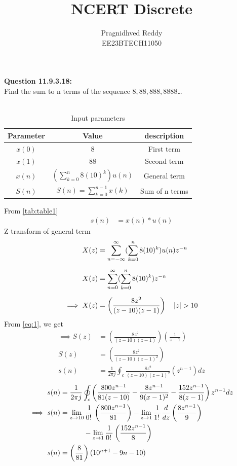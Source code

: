 \documentclass[journal,12pt,twocolumn]{IEEEtran}
\title{NCERT Discrete}
\author{Pragnidhved Reddy\\EE23BTECH11050}
\date{}
\begin{document}
\maketitle
\newpage
\bigskip
\textbf{Question 11.9.3.18:}\\
 Find the sum to n terms of the sequence $8,88,888,8888$\ldots\\
 \solution \\
 \begin{table}[H]
\centering
\setlength{\extrarowheight}{8pt}
\begin{tabular}{|c|c|c|}\hline
\textbf{Parameter} & \textbf{Value} & \textbf{description}\\ \hline
$x(0)$ & 8 & First term \\ \hline
$x(1)$ & 88 & Second term \\ \hline 
$x(n)$ & $(\sum^{n}_{k=0}8(10)^k)u(n)$ & General term \\ \hline
$S(n)$ & $S(n)=\sum^{n-1}_{k=0}x(k)$ & Sum of n terms \\ \hline
\end{tabular}
\caption{Input parameters}
\label{tab:table1}
\end{table}
 From \eqref{tab:table1}
\begin{align}
\label{eq:1}
 s(n)&=x(n)* u(n)
 \end{align}
 Z transform of general term
 \begin{align}
 X(z)&=\sum_{n=-\infty}^{\infty}(\sum_{k=0}^{n}8(10)^k)u(n)z^{-n}\\[6pt]
 X(z)&=\sum_{n=0}^{\infty}(\sum_{k=0}^{n}8(10)^k)z^{-n}\\[6pt]
 \implies X(z)&=\left(\frac{8z^2}{(z-10)(z-1)}\right) \quad \left\vert z\right\vert>10
\end{align}
From \eqref{eq:1}, we get
 \begin{align}
 \label{eq:6}
 \implies S(z)&=\left(\frac{8z^2}{(z-10)(z-1)}\right)\left(\frac{1}{z-1}\right)\\[6pt]
 S(z)&=\left(\frac{8z^2}{(z-10)(z-1)^2}\right)\\[6pt]
 s(n)&=\frac{1}{2\pi j}\oint_{c}\frac{8z^2}{(z-10)(z-1)^2}(z^{n-1})dz
 \end{align}
\begin{align}
s(n)&=\frac{1}{2\pi j} \oint_{c} \left(\frac{800z^{n-1}}{81(z-10)}-\frac{8z^{n-1}}{9(x-1)^2}-\frac{152z^{n-1}}{8(z-1)}\right)z^{n-1}dz\\
\notag \implies s(n)&=\lim_{z\to10}\frac{1}{0\displaystyle !\,}\left(\frac{800z^{n-1}}{81}\right)-\lim_{z\to1}\frac{1}{1\displaystyle !\,}\frac{d}{dz}\left(\frac{8z^{n-1}}{9}\right) \\ &~~~~~~~~~~-\lim_{z\to1}\frac{1}{0\displaystyle !\,}\left(\frac{152z^{n-1}}{8}\right)\\
 s(n)&=\left(\frac{8}{81}\right)(10^{n+1}-9n-10)   
\end{align}
\end{document}
